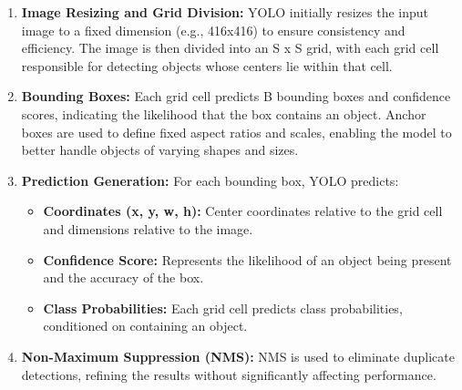\begin{enumerate}
  \item \textbf{Image Resizing and Grid Division:} YOLO initially resizes the input image to a fixed dimension (e.g., 416x416) to ensure consistency and efficiency. The image is then divided into an S x S grid, with each grid cell responsible for detecting objects whose centers lie within that cell. 
  \item \textbf{Bounding Boxes:} Each grid cell predicts B bounding boxes and confidence scores, indicating the likelihood that the box contains an object. Anchor boxes are used to define fixed aspect ratios and scales, enabling the model to better handle objects of varying shapes and sizes.
  \item \textbf{Prediction Generation:} For each bounding box, YOLO predicts:
   \begin{itemize}
  \item \textbf{Coordinates (x, y, w, h): } Center coordinates relative to the grid cell and dimensions relative to the image.
  \item \textbf{Confidence Score:} Represents the likelihood of an object being present and the accuracy of the box.
  \item \textbf{Class Probabilities:} Each grid cell predicts class probabilities, conditioned on containing an object.
   \end{itemize}
  \item \textbf{Non-Maximum Suppression (NMS):} NMS is used to eliminate duplicate detections, refining the results without significantly affecting performance.
\end{enumerate}
